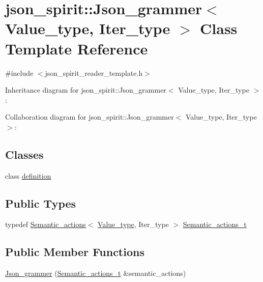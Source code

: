 \hypertarget{classjson__spirit_1_1_json__grammer}{}\section{json\+\_\+spirit\+:\+:Json\+\_\+grammer$<$ Value\+\_\+type, Iter\+\_\+type $>$ Class Template Reference}
\label{classjson__spirit_1_1_json__grammer}


{\ttfamily \#include $<$json\+\_\+spirit\+\_\+reader\+\_\+template.\+h$>$}



Inheritance diagram for json\+\_\+spirit\+:\+:Json\+\_\+grammer$<$ Value\+\_\+type, Iter\+\_\+type $>$\+:


Collaboration diagram for json\+\_\+spirit\+:\+:Json\+\_\+grammer$<$ Value\+\_\+type, Iter\+\_\+type $>$\+:
\subsection*{Classes}
\begin{DoxyCompactItemize}
\item 
class \hyperlink{classjson__spirit_1_1_json__grammer_1_1definition}{definition}
\end{DoxyCompactItemize}
\subsection*{Public Types}
\begin{DoxyCompactItemize}
\item 
typedef \hyperlink{classjson__spirit_1_1_semantic__actions}{Semantic\+\_\+actions}$<$ \hyperlink{namespacejson__spirit_aeaad57c912e0370a76f60cd510ad3d74}{Value\+\_\+type}, Iter\+\_\+type $>$ \hyperlink{classjson__spirit_1_1_json__grammer_af002d620720009cf1d1a8b7bdebcd704}{Semantic\+\_\+actions\+\_\+t}
\end{DoxyCompactItemize}
\subsection*{Public Member Functions}
\begin{DoxyCompactItemize}
\item 
\hyperlink{classjson__spirit_1_1_json__grammer_a366061eedf4a7f49161418491c09aa9d}{Json\+\_\+grammer} (\hyperlink{classjson__spirit_1_1_json__grammer_af002d620720009cf1d1a8b7bdebcd704}{Semantic\+\_\+actions\+\_\+t} \&semantic\+\_\+actions)
\end{DoxyCompactItemize}
